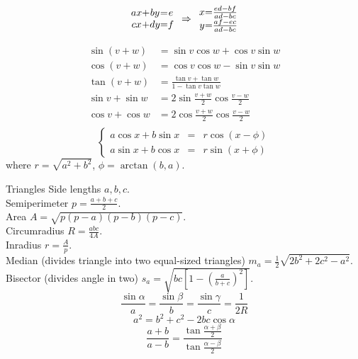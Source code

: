 \clearpage
{}
\categorycontents{}


$$
\begin{array}{c@{+}c@{=}c}
ax & by & e \\
cx & dy & f
\end{array} \Rightarrow
\begin{array}{c@{=}c}
x & \frac{ed-bf}{ad-bc} \\
y & \frac{af-ec}{ad-bc}
\end{array}
$$


\begin{align*}
  \sin(v+w) &= \sin v \cos w + \cos v \sin w \\
  \cos(v+w) &= \cos v \cos w  - \sin v \sin w  \\
  \tan(v+w) &= \frac{\tan v +\tan w }{1-\tan v \tan w }\\
  \sin v +\sin w  &= 2\sin\frac{v+w}{2}\cos\frac{v-w}{2}\\
  \cos v + \cos w & = 2 \cos \frac{v+w}{2} \cos \frac{v-w}{2}\\
\end{align*}
$$
\left\{\begin{array}{rcl}
a\cos x + b \sin x &=& r\cos(x - \phi)\\
a\sin x + b \cos x &=& r\sin(x + \phi)
\end{array}\right.
$$
where $r = \sqrt{a^2+b^2}$, $\phi = \arctan(b,a)$.

\begin{algorithm}{Triangles}
\desc
Side lengths $a, b, c$.\\
Semiperimeter $p =\frac{a+b+c}{2}$.\\
Area $A = \sqrt{p(p-a)(p-b)(p-c)}$.\\
Circumradius $R = \frac{abc}{4A}$.\\
Inradius $r = \frac{A}{p}$.\\
Median (divides triangle into two equal-sized triangles) $m_a =
\frac{1}{2}\sqrt{2b^2+2c^2-a^2}$.\\
Bisector (divides angle in two) $s_a = \sqrt{bc\left[1-\left(\frac{a}{b+c}\right)^2\right]}$.
$$\frac{\sin \alpha}{a} = \frac{\sin \beta}{b} = \frac{\sin \gamma}{c} = \frac{1}{2R}$$
$$a^2 = b^2 + c^2 - 2bc\cos \alpha$$
$$\frac{a+b}{a-b}= \frac{\tan\frac{\alpha+\beta}{2}}{\tan\frac{\alpha-\beta}{2}}$$
\end{algorithm}

